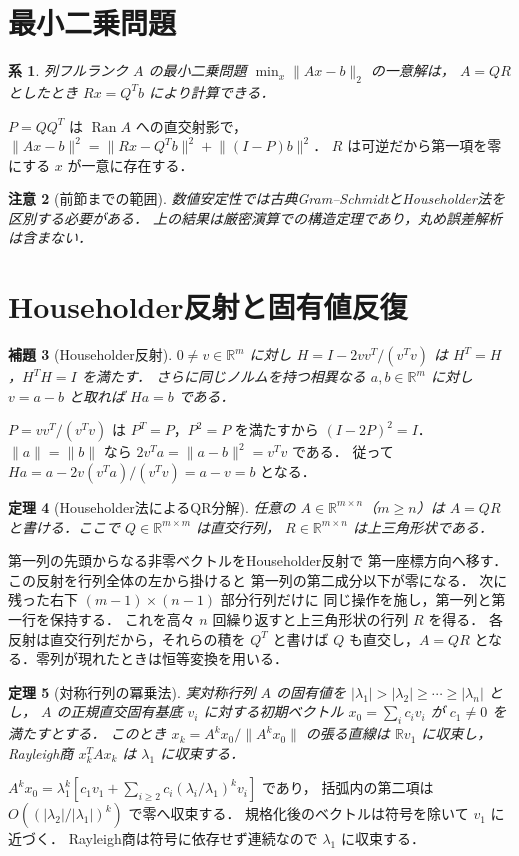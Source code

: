 \documentclass[a5paper,10pt,onecolumn]{jsarticle}
\makeatletter
\theoremstyle{mathnotetheorem}
\newtheorem{theorem}{定理}[section]
\newtheorem{lemma}[theorem]{補題}
\newtheorem{corollary}[theorem]{系}
\newtheorem{remark}[theorem]{注意}
\renewcommand{\proofname}{証明}
\renewenvironment{proof}[1][\proofname]{%
  \par\pushQED{\qed}\normalfont\topsep4\p@\@plus2\p@\relax
  \trivlist\item[\hskip\labelsep\bfseries #1]\ignorespaces
}{\popQED\endtrivlist\@endpefalse}
\newcommand{\norm}[1]{\lVert #1\rVert}
\makeatother
\begin{document}
\section{最小二乗問題}
\begin{corollary}
列フルランク $A$ の最小二乗問題
$\min_x\norm{Ax-b}_2$ の一意解は，
$A=QR$ としたとき $Rx=Q^Tb$ により計算できる．
\end{corollary}
\begin{proof}
$P=QQ^T$ は $\operatorname{Ran}A$ への直交射影で，
$\norm{Ax-b}^2=\norm{Rx-Q^Tb}^2+\norm{(I-P)b}^2$．
$R$ は可逆だから第一項を零にする $x$ が一意に存在する．
\end{proof}
\begin{remark}[前節までの範囲]
数値安定性では古典Gram--SchmidtとHouseholder法を区別する必要がある．
上の結果は厳密演算での構造定理であり，丸め誤差解析は含まない．
\end{remark}


\section{Householder反射と固有値反復}
\begin{lemma}[Householder反射]
$0\ne v\in\mathbb R^m$ に対し
$H=I-2vv^T/(v^Tv)$ は $H^T=H$，$H^TH=I$ を満たす．
さらに同じノルムを持つ相異なる $a,b\in\mathbb R^m$ に対し
$v=a-b$ と取れば $Ha=b$ である．
\end{lemma}
\begin{proof}
$P=vv^T/(v^Tv)$ は $P^T=P$，$P^2=P$ を満たすから
$(I-2P)^2=I$．$\norm a=\norm b$ なら
$2v^Ta=\norm{a-b}^2=v^Tv$ である．
従って $Ha=a-2v(v^Ta)/(v^Tv)=a-v=b$ となる．
\end{proof}
\begin{theorem}[Householder法によるQR分解]
任意の $A\in\mathbb R^{m\times n}$（$m\ge n$）は
$A=QR$ と書ける．ここで $Q\in\mathbb R^{m\times m}$ は直交行列，
$R\in\mathbb R^{m\times n}$ は上三角形状である．
\end{theorem}
\begin{proof}
第一列の先頭からなる非零ベクトルをHouseholder反射で
第一座標方向へ移す．この反射を行列全体の左から掛けると
第一列の第二成分以下が零になる．
次に残った右下 $(m-1)\times(n-1)$ 部分行列だけに
同じ操作を施し，第一列と第一行を保持する．
これを高々 $n$ 回繰り返すと上三角形状の行列 $R$ を得る．
各反射は直交行列だから，それらの積を $Q^T$ と書けば
$Q$ も直交し，$A=QR$ となる．零列が現れたときは恒等変換を用いる．
\end{proof}
\begin{theorem}[対称行列の冪乗法]
実対称行列 $A$ の固有値を
$|\lambda_1|>|\lambda_2|\ge\cdots\ge|\lambda_n|$ とし，
$A$ の正規直交固有基底 $v_i$ に対する初期ベクトル
$x_0=\sum_i c_iv_i$ が $c_1\ne0$ を満たすとする．
このとき $x_k=A^kx_0/\norm{A^kx_0}$ の張る直線は
$\mathbb Rv_1$ に収束し，Rayleigh商
$x_k^TAx_k$ は $\lambda_1$ に収束する．
\end{theorem}
\begin{proof}
$A^kx_0=\lambda_1^k[c_1v_1+
\sum_{i\ge2}c_i(\lambda_i/\lambda_1)^kv_i]$ であり，
括弧内の第二項は $O((|\lambda_2|/|\lambda_1|)^k)$ で零へ収束する．
規格化後のベクトルは符号を除いて $v_1$ に近づく．
Rayleigh商は符号に依存せず連続なので $\lambda_1$ に収束する．
\end{proof}
\end{document}
